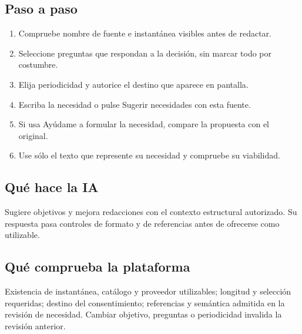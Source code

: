 \subsection{Paso a paso}
\begin{enumerate}
\item Compruebe nombre de fuente e instantánea visibles antes de redactar.\par\nopagebreak[4]
\item Seleccione preguntas que respondan a la decisión, sin marcar todo por costumbre.\par\nopagebreak[4]
\item Elija periodicidad y autorice el destino que aparece en pantalla.\par\nopagebreak[4]
\item Escriba la necesidad o pulse Sugerir necesidades con esta fuente.\par\nopagebreak[4]
\item Si usa Ayúdame a formular la necesidad, compare la propuesta con el original.\par\nopagebreak[4]
\item Use sólo el texto que represente su necesidad y compruebe su viabilidad.\par\nopagebreak[4]
\end{enumerate}
\subsection{Qué hace la IA}
Sugiere objetivos y mejora redacciones con el contexto estructural autorizado. Su respuesta pasa controles de formato y de referencias antes de ofrecerse como utilizable.

\subsection{Qué comprueba la plataforma}
Existencia de instantánea, catálogo y proveedor utilizables; longitud y selección requeridas; destino del consentimiento; referencias y semántica admitida en la revisión de necesidad. Cambiar objetivo, preguntas o periodicidad invalida la revisión anterior.


